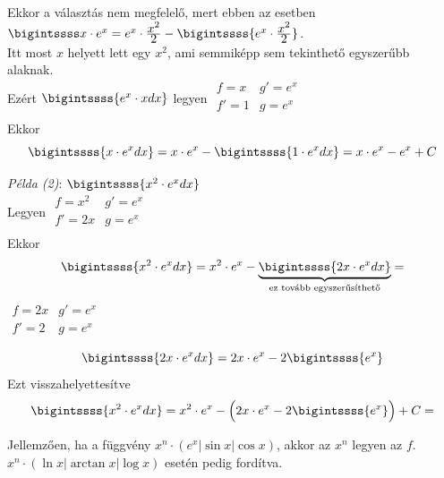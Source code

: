 \documentclass[12pt,margin=0px]{article}
\newcommand\ddfrac[2]{\frac{\displaystyle #1}{\displaystyle #2}}
\begin{document}
    \noindent Ekkor a választás nem megfelelő, mert ebben az esetben $\bigintssss x \cdot e^x = e^{x} \cdot \ddfrac{x^2}{2} - \bigintssss{e^{x} \cdot \ddfrac{x^2}{2}}$.\\

    \noindent Itt most $x$ helyett lett egy $x^2$, ami semmiképp sem tekinthető egyszerűbb alaknak.\\

    \noindent Ezért $\bigintssss{e^x \cdot x dx}$ legyen
    $\begin{array}{c|c}
        f = x & g' = e^{x} \\ \hline
        f' = 1 & g = e^{x} \\
    \end{array}$\\
    Ekkor
    \[
        \bigintssss{x \cdot e^x dx} = x \cdot e^x - \bigintssss{1 \cdot e^x dx} = x \cdot e^x - e^x + C
    \]

    \noindent \emph{Példa (2)}: $\bigintssss{x^2 \cdot e^x dx}$\\
    Legyen
    $\begin{array}{c|c}
        f = x^2 & g' = e^{x} \\ \hline
        f' = 2x & g = e^{x} \\
    \end{array}$\\
    Ekkor
    \[
        \bigintssss{x^2 \cdot e^x dx} = x^2 \cdot e^x - \underbrace{\bigintssss{2x \cdot e^x dx}}_{\text{ez tovább egyszerűsíthető}} =
    \]
    $\begin{array}{c|c}
        f = 2x & g' = e^{x} \\ \hline
        f' = 2 & g = e^{x} \\
    \end{array}$\\
    \[
        \bigintssss{2x \cdot e^x dx} = 2x \cdot e^x - 2 \bigintssss{e^x}
    \]
    Ezt visszahelyettesítve
    \[
        \bigintssss{x^2 \cdot e^x dx} = x^2 \cdot e^x - \Big(2x \cdot e^x - 2 \bigintssss{e^x}\Big) + C =
    \]

    \noindent Jellemzően, ha a függvény $x^{n} \cdot (e^{x}|\sin x|\cos x)$, akkor az $x^{n}$ legyen az $f$. $x^{n} \cdot (\ln x|\arctan x|\log x)$ esetén pedig fordítva.\\
\end{document}

